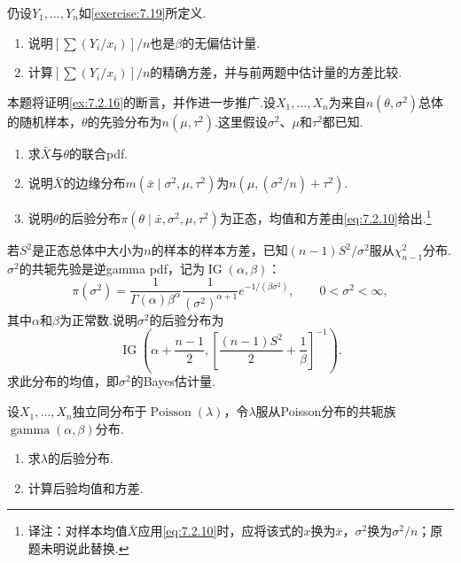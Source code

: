 \begin{exercise}\label{exercise:7.21}
仍设$Y_1,\ldots,Y_n$如\autoref{exercise:7.19}所定义.
\begin{enumerate}[label=(\alph*)]
\item 说明$[\sum(Y_i/x_i)]/n$也是$\beta$的无偏估计量.
\item 计算$[\sum(Y_i/x_i)]/n$的精确方差，并与前两题中估计量的方差比较.
\end{enumerate}
\end{exercise}
\begin{exercise}\label{exercise:7.22}
本题将证明\autoref{ex:7.2.16}的断言，并作进一步推广.设$X_1,\ldots,X_n$为来自$n(\theta,\sigma^2)$总体的随机样本，$\theta$的先验分布为$n(\mu,\tau^2)$.这里假设$\sigma^2$、$\mu$和$\tau^2$都已知.
\begin{enumerate}[label=(\alph*)]
\item 求$\bar X$与$\theta$的联合pdf.
\item 说明$\bar X$的边缘分布$m(\bar x\mid\sigma^2,\mu,\tau^2)$为$n(\mu,(\sigma^2/n)+\tau^2)$.
\item 说明$\theta$的后验分布$\pi(\theta\mid\bar x,\sigma^2,\mu,\tau^2)$为正态，均值和方差由\eqref{eq:7.2.10}给出.\footnote{译注：对样本均值$\bar X$应用\eqref{eq:7.2.10}时，应将该式的$x$换为$\bar x$，$\sigma^2$换为$\sigma^2/n$；原题未明说此替换.}
\end{enumerate}
\end{exercise}
\begin{exercise}\label{exercise:7.23}
若$S^2$是正态总体中大小为$n$的样本的样本方差，已知$(n-1)S^2/\sigma^2$服从$\chi_{n-1}^2$分布.$\sigma^2$的共轭先验是逆gamma pdf，记为$\operatorname{IG}(\alpha,\beta)$：
$$\pi(\sigma^2)=\frac1{\Gamma(\alpha)\beta^\alpha}\frac1{(\sigma^2)^{\alpha+1}}e^{-1/(\beta\sigma^2)},\qquad0<\sigma^2<\infty,$$
其中$\alpha$和$\beta$为正常数.说明$\sigma^2$的后验分布为
$$\operatorname{IG}\left(\alpha+\frac{n-1}2,\left[\frac{(n-1)S^2}2+\frac1\beta\right]^{-1}\right).$$
求此分布的均值，即$\sigma^2$的Bayes估计量.
\end{exercise}
\begin{exercise}\label{exercise:7.24}
设$X_1,\ldots,X_n$独立同分布于$\operatorname{Poisson}(\lambda)$，令$\lambda$服从Poisson分布的共轭族$\operatorname{gamma}(\alpha,\beta)$分布.
\begin{enumerate}[label=(\alph*)]
\item 求$\lambda$的后验分布.
\item 计算后验均值和方差.
\end{enumerate}
\end{exercise}
